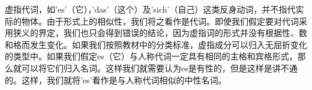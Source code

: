 虚指代词，如'es'（它），'das'（这个）及'sich'（自己）这类反身动词，并不指代实际的物体。由于形式上的相似性，我们将之看作是代词。即使我们假定要对代词采用狭义的界定，我们也只会得到错误的结论，因为虚指词的形式并没有根据性、数和格而发生变化。如果我们按照教材中的分类标准，虚指成分可以归入无屈折变化的类型中。如果我们假定es（它）与人称代词一定具有相同的主格和宾格形式，那么就可以将它们归入名词。这样我们就需要认为es是有性的，但是这样是讲不通的。这样，我们就将'es'看作是与人称代词相似的中性名词。

